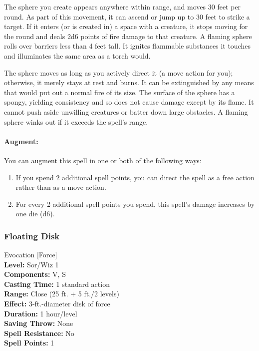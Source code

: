 The sphere you create appears anywhere within range, and moves 30 feet per round. As part of this movement, it can ascend or jump up to 30 feet to strike a target. 
If it enters (or is created in) a space with a creature, it stops moving for the round and deals 2d6 points of fire damage to that creature.
A flaming sphere rolls over barriers less than 4 feet tall. 
It ignites flammable substances it touches and illuminates the same area as a torch would.

The sphere moves as long as you actively direct it (a move action for you); 
otherwise, it merely stays at rest and burns. It can be extinguished by any means that would put out a normal fire of its size. 
The surface of the sphere has a spongy, yielding consistency and so does not cause damage except by its flame. 
It cannot push aside unwilling creatures or batter down large obstacles. 
A flaming sphere winks out if it exceeds the spell's range.

\paragraph{Augment:} You can augment this spell in one or both of the following ways:
\begin{enumerate}
 \item If you spend 2 additional spell points, you can direct the spell as a free action rather than as a move action.
 \item For every 2 additional spell points you spend, this spell's damage increases by one die (d6).
\end{enumerate}
\subsubsection{Floating Disk}
\label{Spell:FloatingDisk}
Evocation [Force]
\\ \textbf{Level:} Sor/Wiz 1
\\ \textbf{Components:} V, S
\\ \textbf{Casting Time:} 1 standard action
\\ \textbf{Range:} Close (25 ft. + 5 ft./2 levels)
\\ \textbf{Effect:} 3-ft.-diameter disk of force
\\ \textbf{Duration:} 1 hour/level
\\ \textbf{Saving Throw:} None
\\ \textbf{Spell Resistance:} No
\\ \textbf{Spell Points:} 1

